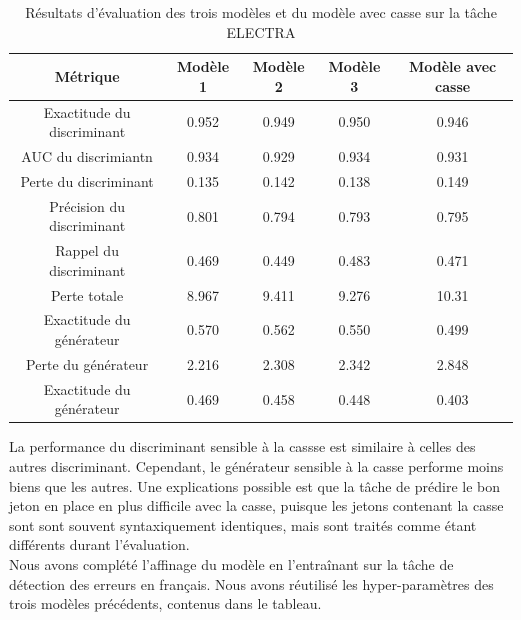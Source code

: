 \documentclass[12pt,twoside,maitrise]{dms}
\theoremstyle{definition}
\numberwithin{equation}{section}
\numberwithin{table}{chapter}
\numberwithin{figure}{chapter}
\begin{document}
\begin{table}[h!]
\centering
\begin{tabular}{||c | c c c c||}
 \hline
    Métrique & Modèle 1 & Modèle 2 & Modèle 3 & Modèle avec casse\\ [0.5ex]
 \hline\hline
    Exactitude du discriminant & 0.952 &  0.949 & 0.950 & 0.946 \\
    AUC du discrimiantn & 0.934 &  0.929 & 0.934  & 0.931\\
    Perte du discriminant & 0.135 &  0.142 & 0.138 & 0.149 \\
    Précision du discriminant & 0.801 &  0.794 & 0.793 & 0.795\\
    Rappel du discriminant & 0.469 &  0.449 & 0.483 & 0.471\\
    Perte totale & 8.967 &  9.411 & 9.276 & 10.31\\
    Exactitude du générateur & 0.570 &  0.562 & 0.550 & 0.499\\
    Perte du générateur & 2.216 &  2.308 & 2.342 & 2.848\\
    Exactitude du générateur & 0.469 &  0.458 & 0.448 & 0.403\\
 \hline
\end{tabular}
\caption{Résultats d'évaluation des trois modèles et du modèle avec casse sur la tâche ELECTRA}
\label{table:respreentrainementaveccasse}
\end{table}

La performance du discriminant sensible à la cassse est similaire à celles des
autres discriminant. Cependant, le générateur sensible à la casse performe
moins biens que les autres. Une explications possible est que la tâche de
prédire le bon jeton en place en plus difficile avec la casse, puisque les
jetons contenant la casse sont sont souvent syntaxiquement identiques, mais
sont traités comme étant différents durant l'évaluation.\\

Nous avons complété l'affinage du modèle en l'entraînant sur la tâche de
détection des erreurs en français. Nous avons réutilisé les hyper-paramètres
des trois modèles précédents, contenus dans le tableau.
\end{document}
